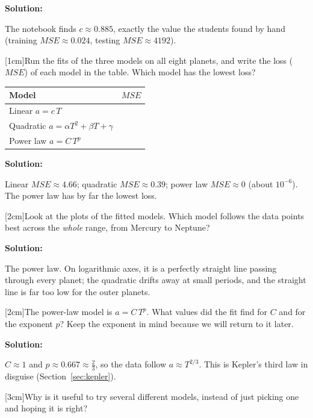 \documentclass[12pt]{article}
\makeatletter
\newcounter{question}
\newlength\questionheight
\newcommand{\question}{\@ifstar{\question@text}{\question@field}}
\newcommand{\question@heading}[1]{%
  \refstepcounter{question}%
  \vspace{0.3cm}%
  \noindent\textbf{\faEdit\ Question \thequestion: #1}%
}
\newcommand{\question@text}[1]{%
  \question@heading{#1}%
}
\newcommand{\question@field}[2][\questionheight]{%
  \question@heading{#2}%
 \\[0.3em] \begin{Form}
    \TextField[
      name=Q\thequestion,
      multiline=true,
      width=\linewidth,
      height=#1,
      charsize=10pt,
      bordercolor={0 0 0},
      borderwidth=1.8,
      backgroundcolor={1 1 1}
    ]{}
  \end{Form}
  \vspace{0.3cm}%
}
\newenvironment{solution}{%
  \begin{solutionbox}\textbf{Solution:}
}{%
  \end{solutionbox}
}
\makeatother
\begin{document}
\begin{solution}
The notebook finds $c \approx 0.885$, exactly the value the students found by hand (training $MSE \approx 0.024$, testing $MSE \approx 4192$).
\end{solution}

\question[1cm]{Run the fits of the three models on all eight planets, and write the loss ($MSE$) of each model in the table. Which model has the lowest loss?}

\vspace{0.3cm}
\begin{tabular}{|l|c|}
\hline
    Model & $MSE$ \\ \hline
    Linear \; $a=c\,T$ & \\ \hline
    Quadratic \; $a=\alpha T^2+\beta T+\gamma$ & \\ \hline
    Power law \; $a=C\,T^{p}$ & \\ \hline
\end{tabular}
\vspace{0.3cm}

\begin{solution}
Linear $MSE \approx 4.66$; quadratic $MSE \approx 0.39$; power law $MSE \approx 0$ (about $10^{-6}$). The power law has by far the lowest loss.
\end{solution}

\question[2cm]{Look at the plots of the fitted models. Which model follows the data points best across the \emph{whole} range, from Mercury to Neptune?}

\begin{solution}
The power law. On logarithmic axes, it is a perfectly straight line passing through every planet; the quadratic drifts away at small periods, and the straight line is far too low for the outer planets.
\end{solution}

\question[2cm]{The power-law model is $a = C\,T^{p}$. What values did the fit find for $C$ and for the exponent $p$? Keep the exponent in mind because we will return to it later.}

\begin{solution}
$C \approx 1$ and $p \approx 0.667 \approx \tfrac{2}{3}$, so the data follow $a \approx T^{2/3}$. This is Kepler's third law in disguise (Section~\ref{sec:kepler}).
\end{solution}

\question[3cm]{Why is it useful to try several different models, instead of just picking one and hoping it is right?} 
\end{document}
